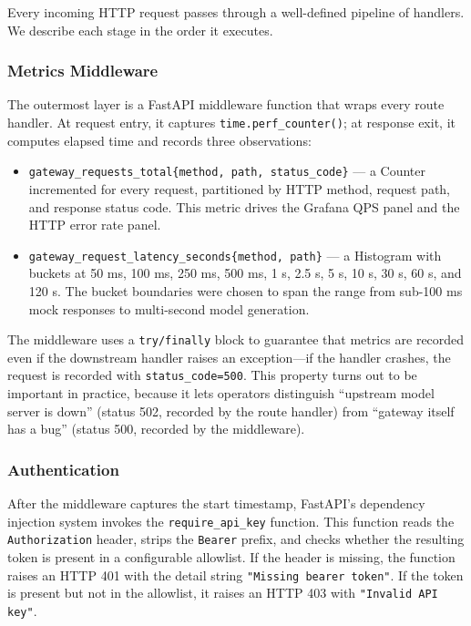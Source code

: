 \documentclass[10pt,journal]{IEEEtran}
\begin{document}
Every incoming HTTP request passes through a well-defined pipeline of handlers. We describe each stage in the order it executes.

\subsubsection{Metrics Middleware}

The outermost layer is a FastAPI middleware function that wraps every route handler. At request entry, it captures \texttt{time.perf\_counter()}; at response exit, it computes elapsed time and records three observations:

\begin{itemize}
  \item \texttt{gateway\_requests\_total\{method, path, status\_code\}} --- a Counter incremented for every request, partitioned by HTTP method, request path, and response status code. This metric drives the Grafana QPS panel and the HTTP error rate panel.
  \item \texttt{gateway\_request\_latency\_seconds\{method, path\}} --- a Histogram with buckets at 50 ms, 100 ms, 250 ms, 500 ms, 1 s, 2.5 s, 5 s, 10 s, 30 s, 60 s, and 120 s. The bucket boundaries were chosen to span the range from sub-100 ms mock responses to multi-second model generation.
\end{itemize}

The middleware uses a \texttt{try/finally} block to guarantee that metrics are recorded even if the downstream handler raises an exception---if the handler crashes, the request is recorded with \texttt{status\_code=500}. This property turns out to be important in practice, because it lets operators distinguish ``upstream model server is down'' (status 502, recorded by the route handler) from ``gateway itself has a bug'' (status 500, recorded by the middleware).

\subsubsection{Authentication}

After the middleware captures the start timestamp, FastAPI's dependency injection system invokes the \texttt{require\_api\_key} function. This function reads the \texttt{Authorization} header, strips the \texttt{Bearer} prefix, and checks whether the resulting token is present in a configurable allowlist. If the header is missing, the function raises an HTTP 401 with the detail string \texttt{"Missing bearer token"}. If the token is present but not in the allowlist, it raises an HTTP 403 with \texttt{"Invalid API key"}.
\end{document}
